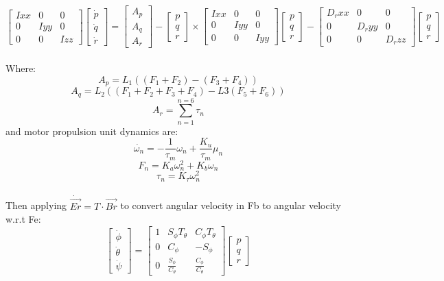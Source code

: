 \documentclass[12pt,a4paper,twoside]{report}
\begin{document}
			$$ 
			\begin{bmatrix}
			Ixx & 0 & 0 \\
			0 & Iyy & 0 \\
			0 & 0 & Izz
			\end{bmatrix}
			\begin{bmatrix}
			\dot{p} \\
			\dot{q} \\
			\dot{r}
			\end{bmatrix}
			=
			\begin{bmatrix}
			A_p \\
			A_q \\
			A_r
			\end{bmatrix}
			-
			\begin{bmatrix}
			p \\
			q \\
			r 
			\end{bmatrix}
			\times
			\begin{bmatrix}
			Ixx & 0 & 0 \\
			0 & Iyy & 0 \\
			0 & 0 & Iyy
			\end{bmatrix}
			\begin{bmatrix}
			p \\
			q \\
			r 
			\end{bmatrix}
			-
			\begin{bmatrix}
			D_rxx & 0 & 0 \\
			0 & D_ryy & 0 \\
			0 & 0 & D_rzz
			\end{bmatrix}
			\begin{bmatrix}
			p \\
			q \\
			r
			\end{bmatrix}
			$$ 
			\\
			Where:
			\[ A_p = L_1 ((F_1+F_2) - (F_3+F_4)) \]
			\[ A_q = L_2 ((F_1+F_2+F_3+F_4) - L3 (F_5+F_6)) \]
			\[ A_r = \sum_{n = 1}^{n = 6}\tau_n \]
			and motor propulsion unit dynamics are:
			\[\dot{\omega_n} = -\frac{1}{\tau_m}\omega_n	 + \frac{K_u}{\tau_m}\mu_n\]
			\[ F_n = K_a \omega_n^2 + K_b\omega_n \]
			\[\tau_n = K_\tau \omega_n^2 \]
			\\
			Then applying \(\dot{\vec{Er}} = T \cdot \vec{Br} \) to convert angular velocity in Fb to angular velocity w.r.t Fe:
			\\
			$$
			\begin{bmatrix}
			\dot{\phi} \\
			\dot{\theta} \\
			\dot{\psi}
			\end{bmatrix}
			=
			\begin{bmatrix}
			1 & S_\phi T_\theta & C_\phi T_\theta \\
			0 & C_\phi & -S_\phi\\
			0 & \frac{S_\phi}{C_\theta}  & \frac{C_\phi}{C_\theta}
			\end{bmatrix}
			\begin{bmatrix}
			p \\
			q \\
			r 
			\end{bmatrix}
			$$ 
			
\end{document}
